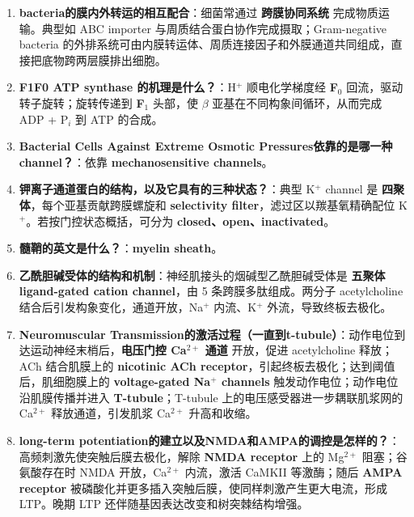 \documentclass[12pt,fontset=none]{ctexart}
\begin{document}
\begin{enumerate}
\item \textbf{bacteria的膜内外转运的相互配合}：细菌常通过 \textbf{跨膜协同系统} 完成物质运输。典型如 ABC importer 与周质结合蛋白协作完成摄取；Gram-negative bacteria 的外排系统可由内膜转运体、周质连接因子和外膜通道共同组成，直接把底物跨两层膜排出细胞。

\item \textbf{F1F0 ATP synthase 的机理是什么？}：H$^+$ 顺电化学梯度经 \textbf{F$_0$} 回流，驱动转子旋转；旋转传递到 \textbf{F$_1$} 头部，使 $\beta$ 亚基在不同构象间循环，从而完成 ADP + P$_i$ 到 ATP 的合成。

\item \textbf{Bacterial Cells Against Extreme Osmotic Pressures依靠的是哪一种channel？}：依靠 \textbf{mechanosensitive channels}。

\item \textbf{钾离子通道蛋白的结构，以及它具有的三种状态？}：典型 K$^+$ channel 是 \textbf{四聚体}，每个亚基贡献跨膜螺旋和 \textbf{selectivity filter}，滤过区以羰基氧精确配位 K$^+$。若按门控状态概括，可分为 \textbf{closed、open、inactivated}。

\item \textbf{髓鞘的英文是什么？}：\textbf{myelin sheath}。

\item \textbf{乙酰胆碱受体的结构和机制}：神经肌接头的烟碱型乙酰胆碱受体是 \textbf{五聚体 ligand-gated cation channel}，由 5 条跨膜多肽组成。两分子 acetylcholine 结合后引发构象变化，通道开放，Na$^+$ 内流、K$^+$ 外流，导致终板去极化。

\item \textbf{Neuromuscular Transmission的激活过程（一直到t-tubule）}：动作电位到达运动神经末梢后，\textbf{电压门控 Ca$^{2+}$ 通道} 开放，促进 acetylcholine 释放；ACh 结合肌膜上的 \textbf{nicotinic ACh receptor}，引起终板去极化；达到阈值后，肌细胞膜上的 \textbf{voltage-gated Na$^+$ channels} 触发动作电位；动作电位沿肌膜传播并进入 \textbf{T-tubule}；T-tubule 上的电压感受器进一步耦联肌浆网的 Ca$^{2+}$ 释放通道，引发肌浆 Ca$^{2+}$ 升高和收缩。

\item \textbf{long-term potentiation的建立以及NMDA和AMPA的调控是怎样的？}：高频刺激先使突触后膜去极化，解除 \textbf{NMDA receptor} 上的 Mg$^{2+}$ 阻塞；谷氨酸存在时 NMDA 开放，Ca$^{2+}$ 内流，激活 CaMKII 等激酶；随后 \textbf{AMPA receptor} 被磷酸化并更多插入突触后膜，使同样刺激产生更大电流，形成 LTP。晚期 LTP 还伴随基因表达改变和树突棘结构增强。
\end{enumerate}
\end{document}
